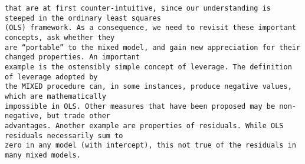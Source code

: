 \documentclass[]{article}
\begin{document}
\begin{verbatim}
that are at first counter-intuitive, since our understanding is steeped in the ordinary least squares
(OLS) framework. As a consequence, we need to revisit these important concepts, ask whether they
are “portable” to the mixed model, and gain new appreciation for their changed properties. An important
example is the ostensibly simple concept of leverage. The definition of leverage adopted by
the MIXED procedure can, in some instances, produce negative values, which are mathematically
impossible in OLS. Other measures that have been proposed may be non-negative, but trade other
advantages. Another example are properties of residuals. While OLS residuals necessarily sum to
zero in any model (with intercept), this not true of the residuals in many mixed models.
\end{verbatim}
\end{document}
